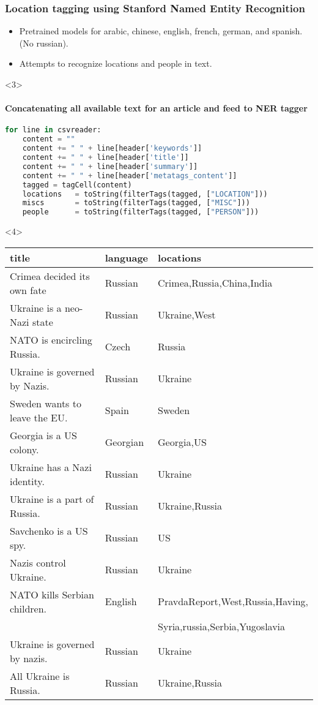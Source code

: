 \documentclass{beamer}
\begin{document}
\begin{frame}[fragile]
    \frametitle{Location tagging using Stanford Named Entity Recognition}
    \begin{itemize}
        \item<1-2> Pretrained models for arabic, chinese, english, french, german, and spanish. (No russian). 
        \item<2-2> Attempts to recognize locations and people in text.
    \end{itemize}
    \begin{onlyenv}<3>
        \framesubtitle<3>{Concatenating all available text for an article and feed to NER tagger}
        \begin{lstlisting}[language=Python]
for line in csvreader:                                
    content = ""                                    
    content += " " + line[header['keywords']]
    content += " " + line[header['title']]
    content += " " + line[header['summary']]
    content += " " + line[header['metatags_content']]
    tagged = tagCell(content)          
    locations   = toString(filterTags(tagged, ["LOCATION"]))
    miscs       = toString(filterTags(tagged, ["MISC"]))
    people      = toString(filterTags(tagged, ["PERSON"]))
        \end{lstlisting}
    \end{onlyenv}
    \begin{onlyenv}<4>
    {\footnotesize
    \begin{tabular}{l | l | l }
        {\bf title } & {\bf language } & {\bf locations }\\ \hline
        Crimea decided its own fate & Russian & Crimea,Russia,China,India \\
        Ukraine is a neo-Nazi state & Russian & Ukraine,West \\
        NATO is encircling Russia. & Czech & Russia \\
        Ukraine is governed by Nazis. & Russian & Ukraine \\
        Sweden wants to leave the EU. & Spain & Sweden \\
        Georgia is a US colony. & Georgian & Georgia,US \\
        Ukraine has a Nazi identity. & Russian & Ukraine \\
        Ukraine is a part of Russia. & Russian & Ukraine,Russia \\
        Savchenko is a US spy. & Russian & US \\
        Nazis control Ukraine. & Russian & Ukraine \\
        NATO kills Serbian children. & English & PravdaReport,West,Russia,Having,\\
                                     &         & Syria,russia,Serbia,Yugoslavia \\
        Ukraine is governed by nazis. & Russian & Ukraine \\
        All Ukraine is Russia. & Russian & Ukraine,Russia \\
    \end{tabular}
    }
    \end{onlyenv}


\end{frame}
\end{document}
